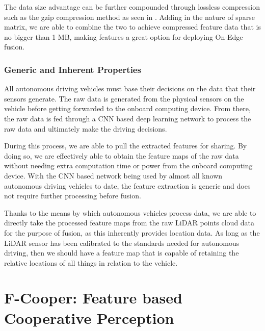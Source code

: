 \documentclass[sigconf]{acmart}
\begin{document}
The data size advantage can be further compounded through lossless compression such as the gzip compression method as seen in \cite{gzip}. Adding in the nature of sparse matrix, we are able to combine the two to achieve compressed feature data that is no bigger than 1 MB, making features a great option for deploying On-Edge fusion.

\subsubsection{\textbf{Generic and Inherent Properties}}

All autonomous driving vehicles must base their decisions on the data that their sensors generate. The raw data is generated from the physical sensors on the vehicle before getting forwarded to the onboard computing device. From there, the raw data is fed through a CNN based deep learning network to process the raw data and ultimately make the driving decisions. 

During this process, we are able to pull the extracted features for sharing. By doing so, we are effectively able to obtain the feature maps of the raw data without needing extra computation time or power from the onboard computing device. With the CNN based network being used by almost all known autonomous driving vehicles to date, the feature extraction is generic and does not require further processing before fusion. 



Thanks to the means by which autonomous vehicles process data, we are able to directly take the processed feature maps from the raw LiDAR points cloud data for the purpose of fusion, as this inherently provides location data. As long as the LiDAR sensor has been calibrated to the standards needed for autonomous driving, then we should have a feature map that is capable of retaining the relative locations of all things in relation to the vehicle.








\section{F-Cooper: Feature based Cooperative Perception}
\end{document}
